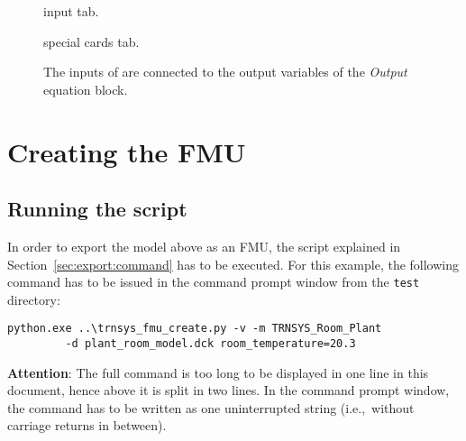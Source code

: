 \begin{figure}[h!]
\caption{\typeb input tab.}
\label{fig:type_input_tab}
\end{figure}


\begin{figure}[h!]
\caption{\typeb special cards tab.}
\label{fig:type_special_cards_tab}
\end{figure}

\clearpage

\begin{figure}[h!]
\vspace*{5mm}
\caption{The inputs of \typeb are connected to the output variables of the \emph{Output} equation block.}
\label{fig:type_connection}
\end{figure}

\section{Creating the FMU}

\subsection{Running the script}

In order to export the model above as an FMU, the \python script explained in Section~\ref{sec:export:command} has to be executed.
For this example, the following command has to be issued in the command prompt window from the \texttt{test} directory:
\begin{verbatim}
python.exe ..\trnsys_fmu_create.py -v -m TRNSYS_Room_Plant
         -d plant_room_model.dck room_temperature=20.3
\end{verbatim}
\textbf{Attention}:
The full command is too long to be displayed in one line in this document, hence above it is split in two lines.
In the command prompt window, the command has to be written as one uninterrupted string (i.e.,~without carriage returns \keys{\return} in between).

